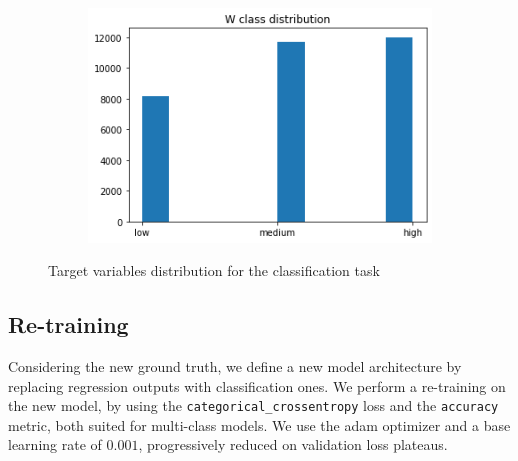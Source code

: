 \begin{figure}[!h]
\begin{center}
\begin{subfigure}[h]{0.24\textwidth}
		\end{subfigure}
		\hfill
		\begin{subfigure}[h]{0.24\textwidth}
			\centering
			\includegraphics[width=1\textwidth]{"contents/images/distributions/w-class"}
		\end{subfigure}
	\end{center}
	\vspace{-0.5cm}
	\caption[Target variables distribution for the classification task]{Target variables distribution for the classification task}
	\label{fig:proximitynet-dataset-distribution-class}
\end{figure}



\subsection{Re-training}
\label{subsec:gradcam-retrain}

Considering the new ground truth, we define a new model architecture by replacing regression outputs with classification ones. 
We perform a re-training on the new model, by using the \texttt{categorical\_crossentropy} loss and the \texttt{accuracy} metric, both suited for multi-class models. We use the \gls{adam} optimizer and a base learning rate of $0.001$, progressively reduced on validation loss plateaus. 

